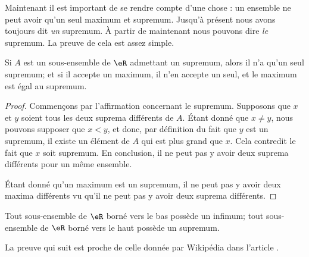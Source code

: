 Maintenant il est important de se rendre compte d'une chose : un ensemble ne peut avoir qu'un seul maximum et supremum. Jusqu'à présent nous avons toujours dit \emph{un} supremum. À partir de maintenant nous pouvons dire \emph{le} supremum. La preuve de cela est assez simple.
\begin{proposition}
Si $A$ est un sous-ensemble de $\eR$ admettant un supremum, alors il n'a qu'un seul supremum; et si il accepte un maximum, il n'en accepte un seul, et le maximum est égal au supremum.
\end{proposition}

\begin{proof}
Commençons par l'affirmation concernant le supremum. Supposons que $x$ et $y$ soient tous les deux suprema différents de $A$. Étant donné que $x\neq y$, nous pouvons supposer que $x<y$, et donc, par définition du fait que $y$ est un supremum, il existe un élément de $A$ qui est plus grand que $x$. Cela contredit le fait que $x$ soit supremum. En conclusion, il ne peut pas y avoir deux suprema différents pour un même ensemble.

Étant donné qu'un maximum est un supremum, il ne peut pas y avoir deux maxima différents vu qu'il ne peut pas y avoir deux suprema différents.
\end{proof}

\begin{proposition}		\label{PropBorneSupInf}
	Tout sous-ensemble de $\eR$ borné vers le bas possède un infimum; tout sous-ensemble de $\eR$ borné vers le haut possède un supremum.
\end{proposition}

La preuve qui suit est proche de celle donnée par Wikipédia  dans l'article .

